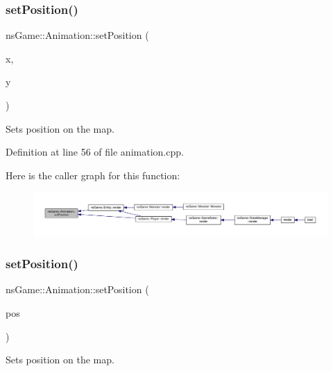 \subsubsection{\texorpdfstring{set\+Position()}{setPosition()}\hspace{0.1cm}{\footnotesize\ttfamily [1/2]}}
{\footnotesize\ttfamily ns\+Game\+::\+Animation\+::set\+Position (\begin{DoxyParamCaption}\item[{int}]{x,  }\item[{int}]{y }\end{DoxyParamCaption})}



Sets position on the map. 



Definition at line 56 of file animation.\+cpp.

Here is the caller graph for this function\+:\nopagebreak
\begin{figure}[H]
\begin{center}
\leavevmode
\includegraphics[width=350pt]{classns_game_1_1_animation_a1a103b09407581b74933001fb8b3a8f0_icgraph}
\end{center}
\end{figure}
\mbox{\label{classns_game_1_1_animation_a2dc40787df4708e3f5d81e5529595574}} 
\subsubsection{\texorpdfstring{set\+Position()}{setPosition()}\hspace{0.1cm}{\footnotesize\ttfamily [2/2]}}
{\footnotesize\ttfamily ns\+Game\+::\+Animation\+::set\+Position (\begin{DoxyParamCaption}\item[{ns\+Graphics\+::\+Vec2D}]{pos }\end{DoxyParamCaption})}



Sets position on the map. 



